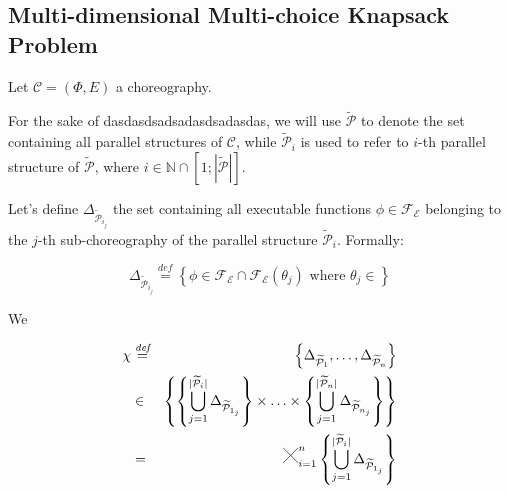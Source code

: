 \documentclass[12pt,a4paper]{report}
\newcommand{\Cross}{\mathbin{\tikz [x=2.5ex,y=2.5ex,line width=.10ex] \draw (0,0) -- (1,1) (0,1) -- (1,0);}}
\newcommand*{\N}{\mathbb{N}}
\newcommand{\mathDef}{\overset{\textit{def}}{=}}
\theoremstyle{definition}
\begin{document}
\newpage
\subsection{Multi-dimensional Multi-choice Knapsack Problem}

Let $\mathcal{C} = (\Phi,E)$ a choreography. 

For the sake of dasdasdsadsadasdsadasdas, we will use $\mathcal{\widetilde{P}}$ to denote the set containing all parallel structures of $\mathcal{C}$, while $\mathcal{\widetilde{P}}_i$ is used to refer to $i$-th parallel structure of $\mathcal{\widetilde{P}}$, where $i \in \N \cap \left[1;|\mathcal{\widetilde{P}}| \right]$.

Let's define $\Delta_{\mathcal{\widetilde{P}}_{i_j}}$ the set containing all executable functions $\phi \in \mathscr{F_E}$ belonging to the $j$-th sub-choreography of the parallel structure $\mathcal{\widetilde{P}}_i$. Formally:

\begin{equation}
	\Delta_{\mathcal{\widetilde{P}}_{i_j}} \mathDef \left\{ \phi \in \mathscr{F_E} \cap \mathscr{F_E}(\theta_j) \text{ where } \theta_j \in  \right\} 
\end{equation}

We 

\begin{eqnarray}
	\chi & \mathDef & \left\lbrace \Delta_{\mathcal{\widetilde{P}}_{1}}, \ldots, \Delta_{\mathcal{\widetilde{P}}_{n}} \right\rbrace \nonumber \\ 
	& \in & \left\{  \left\{ \bigcup_{j=1}^{|\mathcal{\widetilde{P}}_i|} \Delta_{\mathcal{\widetilde{P}}_{1_j}} \right\} \times \ldots \times \left\{ \bigcup_{j=1}^{|\mathcal{\widetilde{P}}_n|} \Delta_{\mathcal{\widetilde{P}}_{n_j}} \right\} \right\}  \nonumber \\
	& = & \Cross_{i = 1}^n  \left\{ \bigcup_{j=1}^{|\mathcal{\widetilde{P}}_i|} \Delta_{\mathcal{\widetilde{P}}_{1_j}} \right\}  \nonumber \\
\end{eqnarray}
\end{document}
